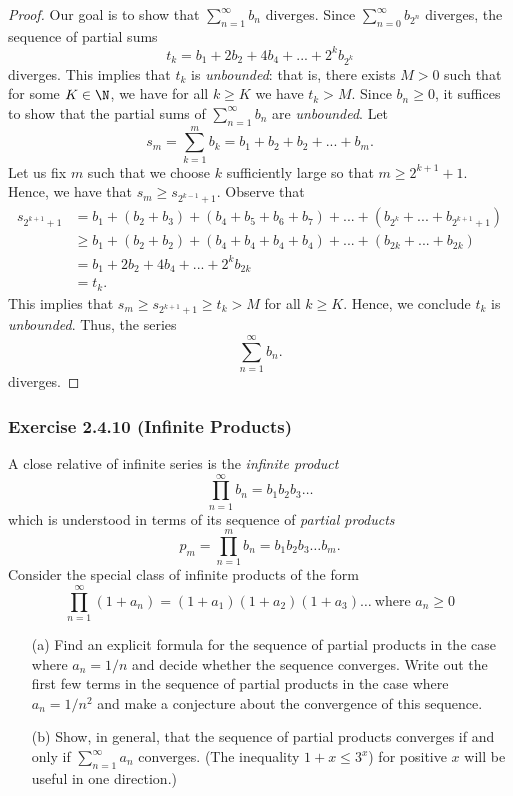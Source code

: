 \begin{proof}
    Our goal is to show that \( \sum_{n=1}^{ \infty} b_n\) diverges. Since \( \sum_{n=0}^{ \infty} b_{{2^n}} \) diverges, the sequence of partial sums 
    \[t_k = b_1 + 2b_2 + 4b_4 + ... + 2^k b_{2^k}\]
    diverges. This implies that \( t_k \) is \textit{unbounded}: that is, there exists \( M > 0 \) such that for some \( K \in \N \), we have for all \( k \geq K \) we have \( t_k > M \). Since \( b_n \geq 0\), it suffices to show that the partial sums of \( \sum_{n=1}^{ \infty} b_n\) are \textit{unbounded}. Let 
    \[ s_m = \sum_{k=1}^{m} b_k = b_1 + b_2 + b_2 + ... + b_m.  \]
    Let us fix \( m \) such that we choose \( k \) sufficiently large so that \( m \geq 2^{k+1} + 1 \). Hence, we have that \( s_m \geq s_{2^{k-1} + 1} \). Observe that 
    \begin{align*}
        s_{2^{k+1}+1} &= b_1 + (b_2 + b_3) + (b_4 + b_5 + b_6 + b_7) + ... + (b_{2^k} + ... + b_{2^{k+1}+1})  \\ 
                      &\geq b_1 + (b_2 + b_2) + (b_4 + b_4 + b_4 + b_4) + ... + (b_{2k} + ... + b_{2k}) \\
                      &= b_1 + 2b_2 + 4b_4 + ... + 2^k b_{2k} \\
                      &= t_k.
    \end{align*}
    This implies that \( s_m \geq s_{2^{k+1}+1} \geq t_k > M \) for all \( k \geq K\). Hence, we conclude \( t_k\) is \textit{unbounded}. Thus, the series 
    \[ \sum_{n=1}^{ \infty} b_n.\]
    diverges.
\end{proof}


\subsubsection{Exercise 2.4.10 (Infinite Products)}
A close relative of infinite series is the \textit{infinite product} 
\[ \prod_{n=1}^{ \infty } b_n = b_1 b_2 b_3 \dots \]
which is understood in terms of its sequence of \textit{partial products}
\[ p_m = \prod_{n=1}^m b_n = b_1b_2b_3 \dots b_m.\]
Consider the special class of infinite products of the form 
\[ \prod_{n=1}^{ \infty} (1 + a_n) = (1+a_1)(1+a_2)(1+a_3) \dots ~ \text{where } a_n \geq 0 \]
\begin{enumerate}
    \item[(a)] Find an explicit formula for the sequence of partial products in the case where \( a_n = 1 / n \) and decide whether the sequence converges. Write out the first few terms in the sequence of partial products in the case where \( a_n = 1 / n^2\) and make a conjecture about the convergence of this sequence.
    \item[(b)] Show, in general, that the sequence of partial products converges if and only if \( \sum_{n=1}^{ \infty} a_n \) converges. (The inequality \( 1 + x \leq 3^x\)) for positive \( x \) will be useful in one direction.)
\end{enumerate}





